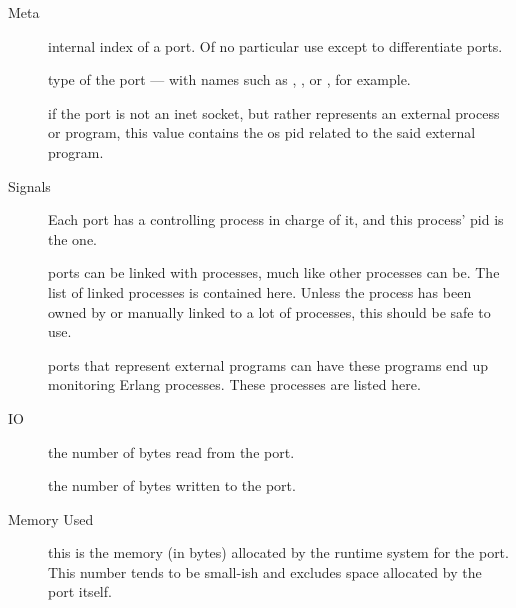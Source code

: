 \begin{description*}
	\item[Meta] \hfill
		\begin{description}		
			\item[] internal index of a port. Of no particular use except to differentiate ports.
			
			\item[] type of the port — with names such as , , or , for example.
			
			\item[] if the port is not an inet socket, but rather represents an external process or program, this value contains the os pid related to the said external program.
		\end{description}

	\item[Signals] \hfill
		\begin{description}		
			\item[] Each port has a controlling process in charge of it, and this process' pid is the  one.
			
			\item[] ports can be linked with processes, much like other processes can be. The list of linked processes is contained here. Unless the process has been owned by or manually linked to a lot of processes, this should be safe to use.
			
			\item[] ports that represent external programs can have these programs end up monitoring Erlang processes. These processes are listed here.
		\end{description}
		
	\item[IO] \hfill
		\begin{description}		
			\item[] the number of bytes read from the port.
			
			\item[] the number of bytes written to the port.
		\end{description}

	\item[Memory Used] \hfill
		\begin{description}		
			\item[] this is the memory (in bytes) allocated by the runtime system for the port. This number tends to be small-ish and excludes space allocated by the port itself.
			

\end{description}
\end{description*}
